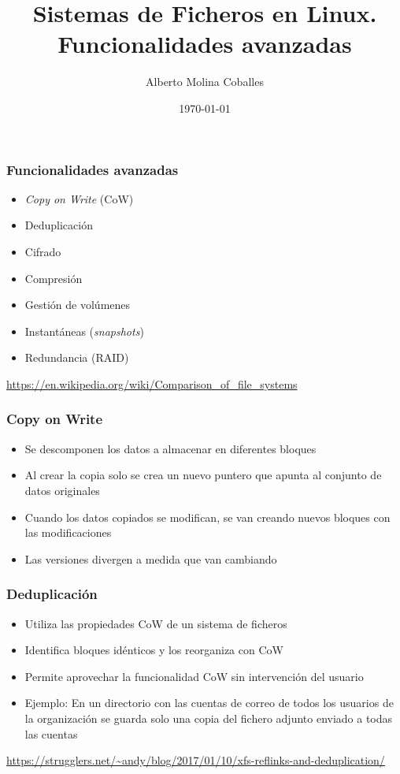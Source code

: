 \documentclass[aspectratio=169]{beamer}
\author{Alberto Molina Coballes}
\title{Sistemas de Ficheros en Linux. Funcionalidades avanzadas}
\institute{IES Gonzalo Nazareno}
\date{\today}
\begin{document}
\def\braces#1{[#1]}

\begin{frame}[t,plain]
\titlepage
\end{frame}

\begin{frame}
  \frametitle{Funcionalidades avanzadas}
  \begin{itemize}
  \item \textit{Copy on Write} (CoW)
  \item Deduplicación
  \item Cifrado
  \item Compresión
  \item Gestión de volúmenes
  \item Instantáneas (\textit{snapshots})
  \item Redundancia (RAID)
  \end{itemize}
  \small{\url{https://en.wikipedia.org/wiki/Comparison_of_file_systems}}
\end{frame}

\begin{frame}
  \frametitle{Copy on Write}
  \begin{itemize}
  \item Se descomponen los datos a almacenar en diferentes bloques
  \item Al crear la copia solo se crea un nuevo puntero que apunta al
    conjunto de datos originales
  \item Cuando los datos copiados se modifican, se van creando nuevos
    bloques con las modificaciones
  \item Las versiones divergen a medida que van cambiando
  \end{itemize}
\end{frame}

\begin{frame}
  \frametitle{Deduplicación}
  \begin{itemize}
  \item Utiliza las propiedades CoW de un sistema de ficheros
  \item Identifica bloques idénticos y los reorganiza con CoW
  \item Permite aprovechar la funcionalidad CoW sin intervención del
    usuario
  \item Ejemplo: En un directorio con las cuentas de correo de todos
    los usuarios de la organización se guarda solo una copia del
    fichero adjunto enviado a todas las cuentas
  \end{itemize}
  \small{\url{https://strugglers.net/~andy/blog/2017/01/10/xfs-reflinks-and-deduplication/}}
\end{frame}
\end{document}
